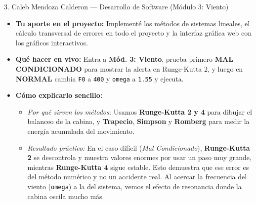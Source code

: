 \documentclass[11pt,a4paper]{article}
\begin{document}
\begin{tarjeta}{3. Caleb Mendoza Calderon — Desarrollo de Software (Módulo 3: Viento)}
\begin{itemize}[noitemsep]
    \item \textbf{Tu aporte en el proyecto:} Implementé los métodos de sistemas lineales, el cálculo transversal de errores en todo el proyecto y la interfaz gráfica web con los gráficos interactivos.
    \item \textbf{Qué hacer en vivo:} Entra a \textbf{Mód. 3: Viento}, prueba primero \textbf{MAL CONDICIONADO} para mostrar la alerta en Runge-Kutta 2, y luego en \textbf{NORMAL} cambia \texttt{F0} a \texttt{400} y \texttt{omega} a \texttt{1.55} y ejecuta.
    \item \textbf{Cómo explicarlo sencillo:}
    \begin{itemize}[noitemsep]
        \item \textit{Por qué sirven los métodos:} Usamos \textbf{Runge-Kutta 2 y 4} para dibujar el balanceo de la cabina, y \textbf{Trapecio}, \textbf{Simpson} y \textbf{Romberg} para medir la energía acumulada del movimiento.
        \item \textit{Resultado práctico:} En el caso difícil (\textit{Mal Condicionado}), \textbf{Runge-Kutta 2} se descontrola y muestra valores enormes por usar un paso muy grande, mientras \textbf{Runge-Kutta 4} sigue estable. Esto demuestra que ese error es del método numérico y no un accidente real. Al acercar la frecuencia del viento (\texttt{omega}) a la del sistema, vemos el efecto de resonancia donde la cabina oscila mucho más.
    \end{itemize}
\end{itemize}
\end{tarjeta}
\end{document}
